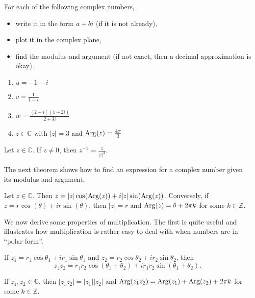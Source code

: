 \begin{problem}\label{prob.ComplexCheckin}
For each of the following complex numbers,
\begin{itemize}
\item write it in the form $a+bi$ (if it is not already),
\item plot it in the complex plane,
\item find the modulus and argument (if not exact, then a decimal approximation is okay).
\end{itemize}
\begin{multicols}{2}
\begin{enumerate}
\item $u = -1-i$
\item $v= \frac{1}{1+i}$
\item $w = \frac{(2-i)(1+2i)}{2+3i}$
\item $z\in \mathbb{C}$ with $|z| = 3$ and $\operatorname{Arg}(z) = \frac{4\pi}{3}$
\end{enumerate}
\end{multicols}
\end{problem}

\begin{theorem}
Let $z\in \mathbb{C}$. If $z\neq 0$, then $z^{-1} = \displaystyle\frac{\overline{z}}{|z|^2}$.
\end{theorem}

The next theorem shows how to find an expression for a complex number given its modulus and argument.
 
\begin{theorem}\label{thm.PolarToRectangular}
Let $z\in \mathbb{C}$. Then $z = |z|\cos(\operatorname{Arg}(z)) + i|z|\sin(\operatorname{Arg}(z))$. Conversely, if $z = r\cos(\theta) + ir\sin(\theta)$, then 
$|z| = r$ and $\operatorname{Arg}(z) = \theta + 2\pi k$ for some $k\in \mathbb{Z}$.
\end{theorem}

We now derive some properties of multiplication. The first is quite useful and illustrates how multiplication is rather easy to deal with when numbers are in ``polar form''.

\begin{theorem}\label{thm.MultiplyComplex}
If $z_1 = r_1\cos\theta_1 + ir_1\sin\theta_1$ and $z_2=r_2\cos\theta_2 + ir_2\sin\theta_2$, then \[z_1z_2 = r_1r_2\cos(\theta_1+\theta_2) + ir_1r_2\sin(\theta_1+\theta_2).\]
\end{theorem}

\begin{corollary}
If $z_1,z_2\in \mathbb{C}$, then $|z_1z_2|=|z_1||z_2|$ and $\operatorname{Arg}(z_1z_2) = \operatorname{Arg}(z_1)+\operatorname{Arg}(z_2)+ 2\pi k$ for some $k\in \mathbb{Z}$.\end{corollary}

